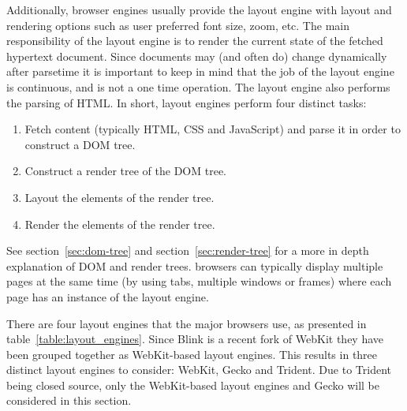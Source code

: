 \documentclass[a4paper,11pt]{kth-mag}
\begin{document}
        Additionally, browser engines usually provide the layout engine with layout and rendering options such as user preferred font size, zoom, etc.
        The main responsibility of the \gls{layout engine} is to render the current state of the fetched \gls{hypertext} \gls{document}.
        Since \glspl{document} may (and often do) change dynamically after parsetime it is important to keep in mind that the job of the \gls{layout engine} is continuous, and is not a one time operation.
        The \gls{layout engine} also performs the parsing of \gls{HTML}.
        In short, \glspl{layout engine} perform four distinct tasks:
        \begin{enumerate}
          \item Fetch content (typically \gls{HTML}, \gls{CSS} and \gls{JavaScript}) and parse it in order to construct a \gls{DOM} tree. 
          \item Construct a \gls{render tree} of the \gls{DOM} tree.
          \item Layout the \glspl{element} of the \gls{render tree}.
          \item Render the \glspl{element} of the \gls{render tree}.
        \end{enumerate}
        See section~\ref{sec:dom-tree} and section~\ref{sec:render-tree} for a more in depth explanation of \gls{DOM} and \glspl{render tree}.
        \Glspl{browser} can typically display multiple pages at the same time (by using tabs, multiple windows or frames) where each page has an instance of the \gls{layout engine}.

        There are four \glspl{layout engine} that the major \glspl{browser} use, as presented in table~\ref{table:layout_engines}.
        Since Blink is a recent \gls{fork} of \gls{WebKit} they have been grouped together as \gls{WebKit}-based \glspl{layout engine}.
        This results in three distinct \glspl{layout engine} to consider: \gls{WebKit}, Gecko and Trident.
        Due to Trident being closed source, only the \gls{WebKit}-based \glspl{layout engine} and Gecko will be considered in this section.
\end{document}
